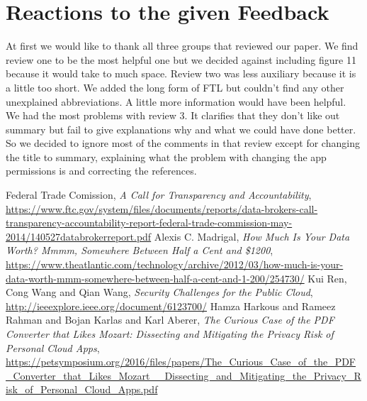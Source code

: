 \documentclass[11pt,twocolumn,a4paper,DIV=calc]{scrartcl}
\begin{document}
\section{Reactions to the given Feedback} 
At first we would like to thank all three groups that reviewed our paper. We find review one to be the most helpful one but we decided against including figure 11 because it would take to much space. Review two was less auxiliary because it is a little too short. We added the long form of FTL but couldn't find any other unexplained abbreviations. A little more information would have been helpful. We had the most problems with review 3. It clarifies that they don't like out summary but fail to give explanations why and what we could have done better. So we decided to ignore most of the comments in that review except for changing the title to summary, explaining what the problem with changing the app permissions is and correcting the references. 
\begin{thebibliography}{99}
  Federal Trade Comission, \emph{A Call for Transparency and Accountability}, \url{https://www.ftc.gov/system/files/documents/reports/data-brokers-call-transparency-accountability-report-federal-trade-commission-may-2014/140527databrokerreport.pdf}
  Alexis C. Madrigal, \emph{How Much Is Your Data Worth? Mmmm, Somewhere Between Half a Cent and \$1200}, \url{https://www.theatlantic.com/technology/archive/2012/03/how-much-is-your-data-worth-mmm-somewhere-between-half-a-cent-and-1-200/254730/}
  Kui Ren, Cong Wang and Qian Wang, \emph{Security Challenges for the Public Cloud}, \url{http://ieeexplore.ieee.org/document/6123700/}
  Hamza Harkous and Rameez Rahman and Bojan Karlas and Karl Aberer, \emph{The Curious Case of the PDF Converter that Likes Mozart: Dissecting and Mitigating the Privacy Risk of Personal Cloud Apps}, \url{https://petsymposium.org/2016/files/papers/The\_Curious\_Case\_of\_the\_PDF\_Converter\_that\_Likes\_Mozart\_\_Dissecting\_and\_Mitigating\_the\_Privacy\_Risk\_of\_Personal\_Cloud\_Apps.pdf}
\end{thebibliography}
\end{document}
